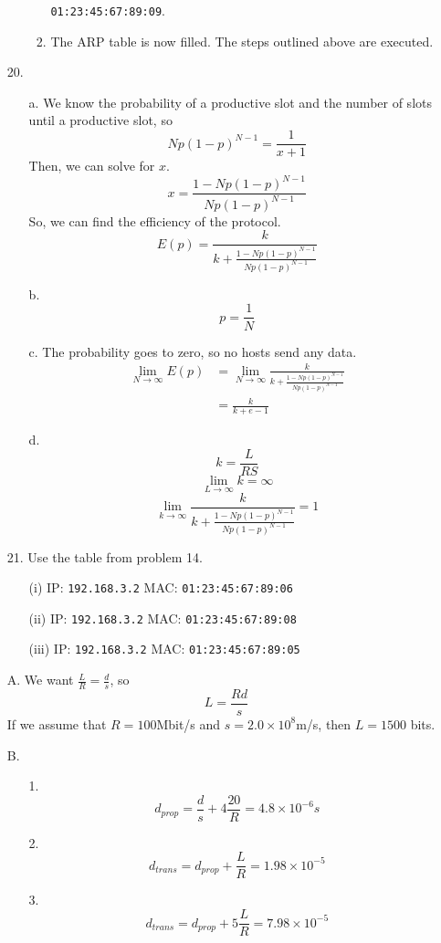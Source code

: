 \documentclass[11pt]{article}
\begin{document}
\begin{itemize}
\begin{itemize}
\begin{enumerate}
                \texttt{01:23:45:67:89:09}.
          \item The ARP table is now filled.  The steps outlined above are
                executed.
        \end{enumerate}
    \end{itemize}
  \item[20.]
    \begin{itemize}
      \item[a.] We know the probability of a productive slot and the number of
      slots until a productive slot, so
      \[ Np(1-p)^{N-1} = \frac{1}{x+1} \]
      Then, we can solve for $x$.
      \[ x = \frac{1-Np(1-p)^{N-1}}{Np(1-p)^{N-1}} \]
      So, we can find the efficiency of the protocol.
      \[ E(p) = \frac{k}{k + \frac{1-Np(1-p)^{N-1}}{Np(1-p)^{N-1}}} \]
      \item[b.] 
      \[ p = \frac{1}{N} \]
      \item[c.] The probability goes to zero, so no hosts send any data.
      \begin{align*}
        \lim_{N \to \infty} E(p)
        &= \lim_{N \to \infty} \frac{k}{k + \frac{1-Np(1-p)^{N-1}}{Np(1-p)^{N-1}}} \\
        &= \frac{k}{k + e - 1}
      \end{align*}
      \item[d.]
      \[ k = \frac{L}{RS} \]
      \[ \lim_{L \to \infty} k = \infty \]
      \[ \lim_{k \to \infty} \frac{k}{k + \frac{1-Np(1-p)^{N-1}}{Np(1-p)^{N-1}}} = 1 \]
    \end{itemize}
  \item[21.] Use the table from problem 14.
    \begin{itemize}
      \item[(i)] IP: \texttt{192.168.3.2} MAC: \texttt{01:23:45:67:89:06}
      \item[(ii)] IP: \texttt{192.168.3.2} MAC: \texttt{01:23:45:67:89:08}
      \item[(iii)] IP: \texttt{192.168.3.2} MAC: \texttt{01:23:45:67:89:05}
    \end{itemize}
  \item[A.] We want $\frac{L}{R} = \frac{d}{s}$, so
    \[ L = \frac{Rd}{s} \]
    If we assume that $R = 100$Mbit/s and $s = 2.0 \times 10^8$m/s, then $L =
    1500$ bits.
  \item[B.]
    \begin{itemize}
      \item[1.]
        \[ d_{prop} = \frac{d}{s} + 4\frac{20}{R} = 4.8 \times 10^{-6} s \]
      \item[2.]
        \[ d_{trans} = d_{prop} + \frac{L}{R} = 1.98 \times 10^{-5} \]
      \item[3.]
        \[ d_{trans} = d_{prop} + 5\frac{L}{R} = 7.98 \times 10^{-5} \]
    \end{itemize}
\end{itemize}
\end{document}
